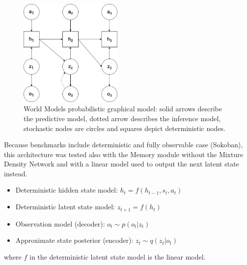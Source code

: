 \begin{figure}[H]
\includegraphics[width=0.45\textwidth,keepaspectratio]{figures/WorldModels/prob_graph_model.png}
\caption[World Models probabilistic graphical model]{World Models probabilistic graphical model: solid arrows describe the predictive model, dotted arrow describes the inference model, stochastic nodes are circles and squares depict deterministic nodes.}
\label{Fig.WorldModelsPGM}
\end{figure}

Because benchmarks include deterministic and fully observable case (Sokoban), this architecture was tested also with the Memory module without the Mixture Density Network and with a linear model used to output the next latent state instead.
\begin{itemize}
\item Deterministic hidden state model:      $h_t = f(h_{t-1}, s_{t}, a_{t})$
\item Deterministic latent state model:      $z_{t+1} = f(h_t)$
\item Observation model (decoder):           $o_t \sim p(o_t|z_t)$
\item Approximate state posterior (encoder): $z_t \sim q(z_t|o_t)$
\end{itemize}
where $f$ in the deterministic latent state model is the linear model.

